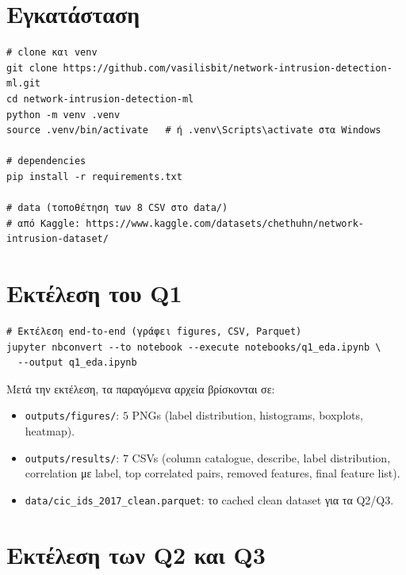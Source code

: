 \documentclass[12pt,a4paper,twoside]{book}
\begin{document}
\section{Εγκατάσταση}

\begin{tcolorbox}[myCustomStyle={Εγκατάσταση}]
\begin{lstlisting}[style=myBashStyle]
# clone και venv
git clone https://github.com/vasilisbit/network-intrusion-detection-ml.git
cd network-intrusion-detection-ml
python -m venv .venv
source .venv/bin/activate   # ή .venv\Scripts\activate στα Windows

# dependencies
pip install -r requirements.txt

# data (τοποθέτηση των 8 CSV στο data/)
# από Kaggle: https://www.kaggle.com/datasets/chethuhn/network-intrusion-dataset/
\end{lstlisting}
\end{tcolorbox}

\section{Εκτέλεση του Q1}

\begin{tcolorbox}[myCustomStyle={Run}]
\begin{lstlisting}[style=myBashStyle]
# Εκτέλεση end-to-end (γράφει figures, CSV, Parquet)
jupyter nbconvert --to notebook --execute notebooks/q1_eda.ipynb \
  --output q1_eda.ipynb
\end{lstlisting}
\end{tcolorbox}

Μετά την εκτέλεση, τα παραγόμενα αρχεία βρίσκονται σε:

\begin{itemize}
    \item \texttt{outputs/figures/}: \(5\) PNGs (label distribution,
    histograms, boxplots, heatmap).
    \item \texttt{outputs/results/}: \(7\) CSVs (column catalogue,
    describe, label distribution, correlation με label, top correlated
    pairs, removed features, final feature list).
    \item \texttt{data/cic\_ids\_2017\_clean.parquet}: το cached clean
    dataset για τα Q2/Q3.
\end{itemize}

\section{Εκτέλεση των Q2 και Q3}
\end{document}
